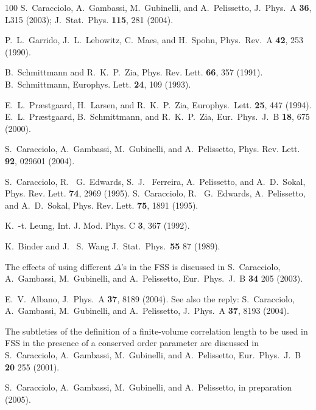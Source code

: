 \documentclass[aps,prl,twocolumn,floatfix,amssymb,showpacs]{revtex4}
\begin{document}
\begin{thebibliography}{100}
  S.~Caracciolo, A.~Gambassi, M.~Gubinelli, and A.~Pelissetto,
  J.\ Phys.\ A {\bf 36}, L315 (2003);
  J.~Stat.~Phys. {\bf 115}, 281 (2004).

  P.~L.~Garrido, J.~L.~Lebowitz, C.~Maes, and H.~Spohn,
  Phys.~Rev.~A {\bf 42}, 253 (1990).

  B.~Schmittmann and R.~K.~P.~Zia,
  Phys. Rev. Lett. {\bf 66}, 357 (1991). 
  B.~Schmittmann,
  Europhys. Lett. {\bf 24}, 109 (1993).

  E.~L.~Pr{\ae}stgaard, H.~Larsen, and R.~K.~P.~Zia,
  Europhys.\ Lett. {\bf 25}, 447 (1994).
  E.~L.~Pr{\ae}stgaard, B.~Schmittmann, and R.~K.~P.~Zia,
  Eur.\ Phys.\ J.\ B {\bf 18}, 675 (2000).

  S.~Caracciolo, A.~Gambassi, M.~Gubinelli, and A.~Pelissetto,
  Phys. Rev. Lett. {\bf 92}, 029601 (2004).

  S.~Caracciolo, R.~ G.~Edwards, S.~J.~ Ferreira, A.~Pelissetto, and
  A.~D.~Sokal,
  Phys. Rev. Lett. {\bf 74}, 2969 (1995).
  S.~Caracciolo, R.~ G.~Edwards, A.~Pelissetto, and A.~D.~Sokal,
  \newblock Phys. Rev. Lett. {\bf 75}, 1891 (1995).

  K.~-t. Leung,
  \newblock Int. J. Mod. Phys. C {\bf 3}, 367 (1992).

  K.~Binder and  J.~ S.~Wang
  J.\ Stat.\ Phys.\ {\bf 55} 87  (1989). 

  The effects of using different $\Delta$'s in the FSS is discussed in
  S.~Caracciolo, A.~Gambassi, M.~Gubinelli, and A.~Pelissetto,
  Eur.\ Phys.\ J.\ B {\bf 34} 205 (2003). 

  E.~V.~Albano, J.~Phys.~A {\bf 37}, 8189 (2004). 
  See also the reply: S.~Caracciolo, A.~Gambassi, M.~Gubinelli, and
  A.~Pelissetto,  J.~Phys.~A {\bf 37}, 8193 (2004). 

  The subtleties of the definition of a finite-volume correlation
  length to be used in FSS in the presence of a conserved order
  parameter are discussed in
  S.~Caracciolo, A.~Gambassi, M.~Gubinelli, and A.~Pelissetto,
  Eur.\ Phys.\ J.\ B {\bf 20} 255  (2001).

  S.~Caracciolo, A.~Gambassi, M.~Gubinelli, and A.~Pelissetto, in
  preparation (2005).

  \end{thebibliography}

  
\end{document}
